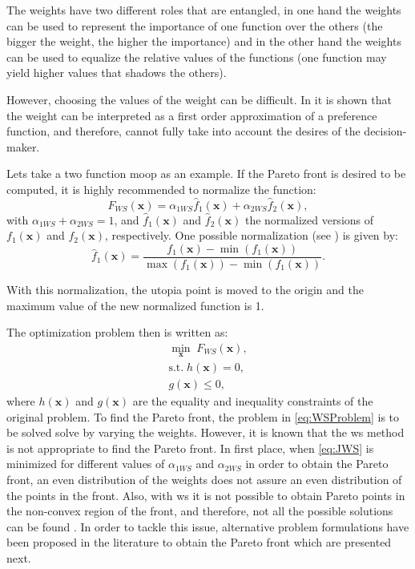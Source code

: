 The weights have two different roles that are entangled, in one hand the weights can be used to represent the importance of one function over the others (the bigger the weight, the higher the importance) and in the other hand the weights can be used to equalize the relative values of the functions (one function may yield higher values that shadows the others).

However, choosing the values of the weight can be difficult. In \citet{Marler2010} it is shown that the weight can be interpreted as a first order approximation of a preference function, and therefore, cannot fully take into account the desires of the decision-maker.

Lets take a two function \gls{moop} as an example. If the Pareto front is desired to be computed, it is highly recommended to normalize the function:
\begin{equation}
F_{WS}(\mathbf{x}) = \alpha_{1WS} \hat{f}_{1}(\mathbf{x}) + \alpha_{2WS} \hat{f}_{2}(\mathbf{x}),
\label{eq:JWS}
\end{equation}
with $\alpha_{1WS} + \alpha_{2WS}=1$, and $\hat{f}_{1}(\mathbf{x})$ and $\hat{f}_{2}(\mathbf{x})$ the normalized versions of $f_{1}(\mathbf{x})$ and $f_{2}(\mathbf{x})$, respectively. One possible normalization (see \citet{Marler2004}) is given by:
\begin{equation}
\hat{f}_{1}(\mathbf{x}) = \frac{f_{1}(\mathbf{x})-\min{\left( f_{1}(\mathbf{x})\right) }}{\max{(f_{1}(\mathbf{x}))}-\min{\left( f_{1}(\mathbf{x})\right) }}.
\label{eq:NormalizedJ}
\end{equation}

With this normalization, the utopia point is moved to the origin and the maximum value of the new normalized function is 1.

The optimization problem then is written as:
\begin{equation}
\begin{gathered}
\min_{\mathbf{x}}{\; F_{WS}(\mathbf{x})}, \\
\text{s.t.} \; h(\mathbf{x})=0, \\
g(\mathbf{x}) \leq 0,
\end{gathered}
\label{eq:WSProblem}
\end{equation}
%
where $h(\mathbf{x})$ and $g(\mathbf{x})$ are the equality and inequality constraints of the original problem. To find the Pareto front, the problem in \eqref{eq:WSProblem} is to be solved solve by varying the weights. However, it is known that the \gls{ws} method is not appropriate to find the Pareto front. In first place, when \eqref{eq:JWS} is minimized for different values of $\alpha_{1WS}$ and $\alpha_{2WS}$ in order to obtain the Pareto front, an even distribution of the weights does not assure an even distribution of the points in the front. Also, with \gls{ws} it is not possible to obtain Pareto points in the non-convex region of the front, and therefore, not all the possible solutions can be found \citep{Das1997}. In order to tackle this issue, alternative problem formulations have been proposed in the literature to obtain the Pareto front which are presented next.
